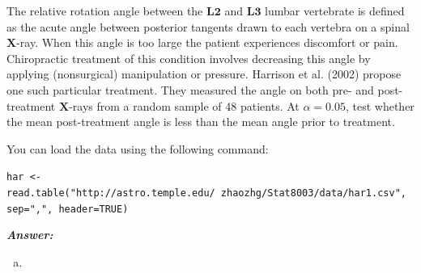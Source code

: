 \documentclass[12pt]{article}
\newenvironment{question}[2][Question]{\begin{trivlist}
\item[\hskip \labelsep {\bfseries #1}\hskip \labelsep {\bfseries #2.}]}{\end{trivlist}}
\begin{document}
\bigskip
\bigskip
 \begin{question}{7.2}  The relative rotation angle between the $\mathbf{L2}$ and $\mathbf{L3}$  lumbar vertebrate is defined as the acute
angle between posterior tangents drawn to each vertebra on a spinal $\mathbf{X}$-ray. When this angle is too
large the patient experiences discomfort or pain. Chiropractic treatment of this condition involves
decreasing this angle by applying (nonsurgical) manipulation or pressure. Harrison et al. (2002)
propose one such particular treatment. They measured the angle on both pre- and post-treatment
$\mathbf{X}$-rays from a random sample of 48 patients. At $\alpha = 0.05$, test whether the mean post-treatment
angle is less than the mean angle prior to treatment.


You can load the data using the following command:


\texttt{har <- read.table("http://astro.temple.edu/~zhaozhg/Stat8003/data/har1.csv", sep=",", header=TRUE)}
\end{question} 

  \textbf{\color{TealBlue}\emph{Answer:} } 

\begin{enumerate}[(a)]

\item 
\end{enumerate}
\end{document}
